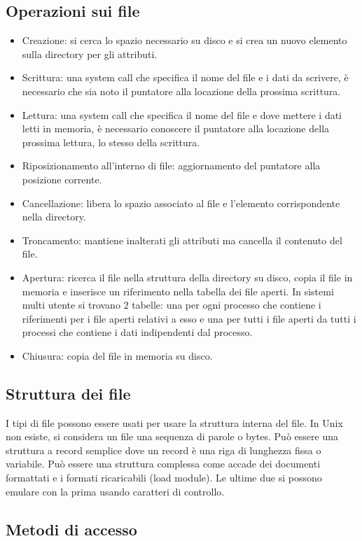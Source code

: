 \subsection{Operazioni sui file}
\begin{itemize}
	\item Creazione: si cerca lo spazio necessario su disco e si crea un nuovo elemento sulla directory per gli attributi.
	\item Scrittura: una system call che specifica il nome del file e i dati da scrivere, \`e necessario che sia noto il puntatore alla locazione della prossima scrittura.
	\item Lettura: una system call che specifica il nome del file e dove mettere i dati letti in memoria, \`e necessario conoscere il puntatore alla locazione della prossima
		lettura, lo stesso della scrittura. 
	\item Riposizionamento all'interno di file: aggiornamento del puntatore alla posizione corrente.
	\item Cancellazione: libera lo spazio associato al file e l'elemento corrispondente nella directory. 
	\item Troncamento: mantiene inalterati gli attributi ma cancella il contenuto del file. 
	\item Apertura: ricerca il file nella struttura della directory su disco, copia il file in memoria e inserisce un riferimento nella tabella dei file aperti. In sistemi 
		multi utente si trovano $2$ tabelle: una per ogni processo che contiene i riferimenti per i file aperti relativi a esso e una per tutti i file aperti da tutti i 
		processi che contiene i dati indipendenti dal processo. 
	\item Chiusura: copia del file in memoria su disco. 
\end{itemize}
\subsection{Struttura dei file}
I tipi di file possono essere usati per usare la struttura interna del file. In Unix non esiste, si considera un file una sequenza di parole o bytes. Pu\`o essere una struttura a 
record semplice dove un record \`e una riga di lunghezza fissa o variabile. Pu\`o essere una struttura complessa come accade dei documenti formattati e i formati ricaricabili (load
module). Le ultime due si possono emulare con la prima usando caratteri di controllo. 
\subsection{Metodi di accesso}
